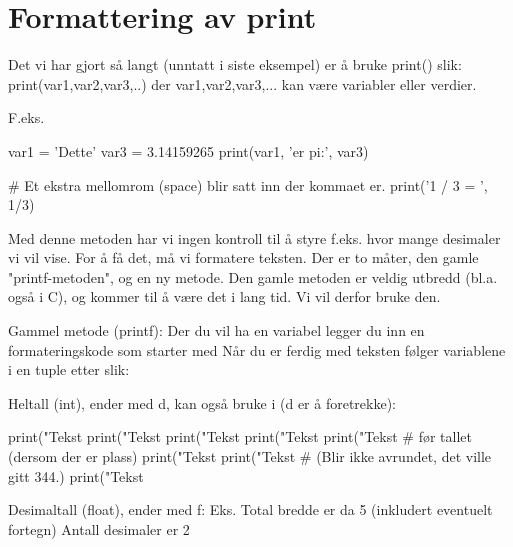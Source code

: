 \section{Formattering av print}

Det vi har gjort så langt (unntatt i siste eksempel) er å bruke print() slik: print(var1,var2,var3,..) der var1,var2,var3,... kan være variabler eller verdier.

F.eks.
\begin{usncodebox}
var1 = 'Dette'
var3 = 3.14159265
print(var1, 'er pi:', var3)

# Et ekstra mellomrom (space) blir satt inn der kommaet er. 
print('1 / 3 = ', 1/3)
\end{usncodebox}

Med denne metoden har vi ingen kontroll til å styre f.eks. hvor mange desimaler vi vil vise. For å få det, må vi formatere teksten. Der er to måter, den gamle "printf-metoden", og en ny metode. Den gamle metoden er veldig utbredd (bl.a. også i C), og kommer til å være det i lang tid. Vi vil derfor bruke den. 

Gammel metode (printf):
Der du vil ha en variabel legger du inn en formateringskode som starter 
med %
Når du er ferdig med teksten følger variablene i en tuple etter %
slik: %

Heltall (int), ender med d, kan også bruke i (d er å foretrekke):
\begin{usncodebox}
print("Tekst %
print("Tekst %
print("Tekst %
print("Tekst %
print("Tekst %
                                   # før tallet (dersom der er plass) 
print("Tekst %
print("Tekst %
                                   # (Blir ikke avrundet, det ville gitt 344.)  
print("Tekst %
\end{usncodebox}

Desimaltall (float), ender med f:  %
Eks. %
  Total bredde er da 5 (inkludert eventuelt fortegn)
  Antall desimaler er 2

